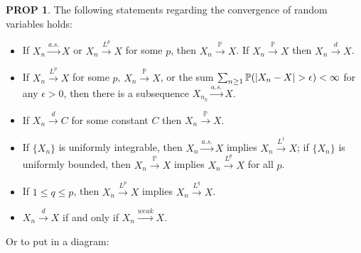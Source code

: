 \documentclass[hidelinks,11pt]{article}
\theoremstyle{definition}
\theoremstyle{dotless}
\newtheorem{prop}{PROP}[section]
\theoremstyle{remark}
\DeclareMathOperator{\1}{\mathbf{1}}
\begin{document}
\begin{prop}
The following statements regarding the convergence of random variables holds:\begin{itemize}
    \item If $X_n\xrightarrow{a.s.}X$ or $X_n\xrightarrow{L^p}X$ for some $p$, then $X_n\xrightarrow{\mathbb{P}}X$. If $X_n\xrightarrow{\mathbb{P}}X$ then $X_n\xrightarrow{d}X$.
    \item If $X_n\xrightarrow{L^p}X$ for some $p$, $X_n\xrightarrow{\mathbb{P}}X$, or the sum $\sum_{n\geq1}\mathbb{P}(\abs{X_n-X}>\epsilon)<\infty$ for any $\epsilon>0$, then there is a subsequence $X_{n_k}\xrightarrow{a.s.}X$.
    \item If $X_n\xrightarrow{d}C$ for some constant $C$ then $X_n\xrightarrow{\mathbb{P}}X$.
    \item If $\{X_n\}$ is uniformly integrable, then $X_n\xrightarrow{a.s.}X$ implies $X_n\xrightarrow{L^1}X$; if $\{X_n\}$ is uniformly bounded, then $X_n\xrightarrow{\mathbb{P}}X$ implies $X_n\xrightarrow{L^p}X$ for all $p$.
    \item If $1\leq q\leq p$, then $X_n\xrightarrow{L^p}X$ implies $X_n\xrightarrow{L^q}X$.
    \item $X_n\xrightarrow{d}X$ if and only if $X_n\xrightarrow{weak}X$.
\end{itemize}
Or to put in a diagram:
\begin{center}\end{center}
\end{prop}
\end{document}
